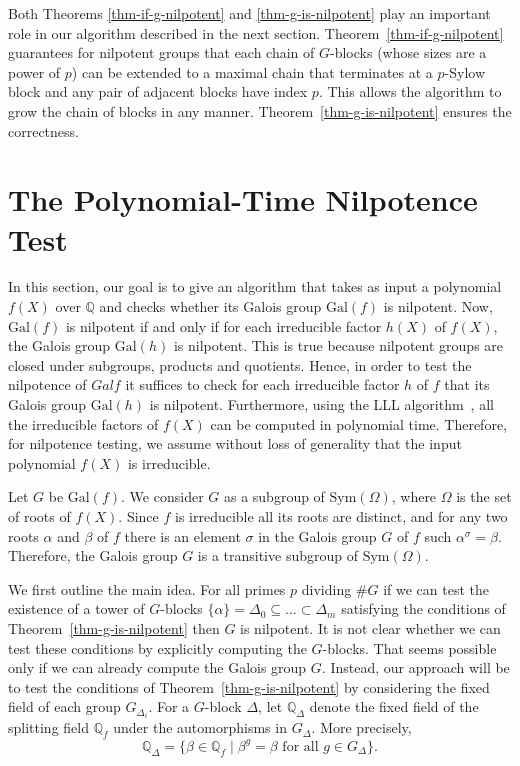\documentclass[prodmod,acmtalg]{acmsmall}
\newcommand{\Gal}[1]{{\ensuremath{\mathrm{Gal}\left(#1\right)}}}
\newcommand{\Sym}[1]{{\ensuremath{\mathrm{Sym}\left(#1\right)}}}
\newcommand{\Q}{\ensuremath{\mathbb{Q}}}
\begin{document}
\begin{remark}
  Both Theorems \ref{thm-if-g-nilpotent} and \ref{thm-g-is-nilpotent}
  play an important role in our algorithm described in the next
  section.  Theorem~\ref{thm-if-g-nilpotent} guarantees for nilpotent
  groups that each chain of $G$-blocks (whose sizes are a power of
  $p$) can be extended to a maximal chain that terminates at a
  $p$-Sylow block and any pair of adjacent blocks have index $p$. This
  allows the algorithm to grow the chain of blocks in any manner.
  Theorem~\ref{thm-g-is-nilpotent} ensures the correctness.
\end{remark}

\section{The Polynomial-Time Nilpotence Test}\label{sec-nilpotence-test}

In this section, our goal is to give an algorithm that takes as input
a polynomial $f(X)$ over $\Q$ and checks whether its Galois group
$\Gal{f}$ is nilpotent. Now, $\Gal{f}$ is nilpotent if and only if for
each irreducible factor $h(X)$ of $f(X)$, the Galois group $\Gal{h}$
is nilpotent. This is true because nilpotent groups are closed under
subgroups, products and quotients. Hence, in order to test the
nilpotence of $Gal{f}$ it suffices to check for each irreducible
factor $h$ of $f$ that its Galois group $\Gal{h}$ is
nilpotent. Furthermore, using the LLL algorithm~\cite{lll}, all the
irreducible factors of $f(X)$ can be computed in polynomial
time. Therefore, for nilpotence testing, we assume without loss of
generality that the input polynomial $f(X)$ is irreducible.

Let $G$ be $\Gal{f}$. We consider $G$ as a subgroup of $\Sym{\Omega}$,
where $\Omega$ is the set of roots of $f(X)$. Since $f$ is irreducible
all its roots are distinct, and for any two roots $\alpha$ and $\beta$
of $f$ there is an element $\sigma$ in the Galois group $G$ of $f$
such $\alpha^\sigma = \beta$. Therefore, the Galois group $G$ is a
transitive subgroup of $\Sym{\Omega}$.

We first outline the main idea. For all primes $p$ dividing $\# G$ if
we can test the existence of a tower of $G$-blocks $\{\alpha\} =
\Delta_0 \subseteq \ldots \subset \Delta_m$ satisfying the conditions
of Theorem~\ref{thm-g-is-nilpotent} then $G$ is nilpotent. It is not
clear whether we can test these conditions by explicitly computing the
$G$-blocks. That seems possible only if we can already compute the
Galois group $G$. Instead, our approach will be to test the conditions
of Theorem~\ref{thm-g-is-nilpotent} by considering the fixed field of
each group $G_{\Delta_i}$. For a $G$-block $\Delta$, let $\Q_\Delta$
denote the fixed field of the splitting field $\Q_f$ under the
automorphisms in $G_\Delta$. More precisely,
\[
\Q_\Delta=\{\beta\in\Q_f\mid \beta^g=\beta \textrm{ for all } g \in
G_\Delta\}.
\]
\end{document}
